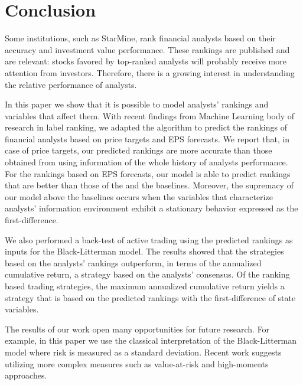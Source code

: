 \documentclass[a4paper,12pt,openright,notitlepage]{report}\usepackage[]{graphicx}\usepackage[]{color}
\begin{document}
\section{Conclusion}
\label{ch4-sec:conclusion}
Some institutions, such as StarMine, rank financial analysts based on their accuracy and investment value performance. These rankings are published and are relevant: stocks favored by top-ranked analysts will probably receive more attention from investors. Therefore, there is a growing interest in understanding the relative performance of analysts. 

In this paper we show that it is possible to model analysts' rankings and variables that affect them. With recent findings from Machine Learning body of research in label ranking, we adapted the algorithm to predict the rankings of financial analysts based on price targets and EPS forecasts. We report that, in case of price targets,  our predicted rankings are more accurate than those obtained from using information of  the whole history of analysts performance. For the rankings based on EPS forecasts, our model is able to predict rankings that are better than those of the  and the \naive{} baselines. Moreover, the supremacy of our model above the baselines occurs when  the variables that characterize analysts' information environment exhibit a stationary behavior expressed as the first-difference. 

We also performed a back-test of active trading using the predicted rankings as inputs for the Black-Litterman model. The results showed that the strategies based on the analysts' rankings outperform, in terms of the annualized cumulative return, a  strategy based on the analysts' consensus. Of the ranking based trading strategies, the maximum annualized cumulative return yields  a strategy that is based on the predicted rankings with the first-difference of state variables. 

The results of our work open many opportunities for future research. For example, in this paper we use the classical interpretation of the Black-Litterman model where risk is measured as a standard deviation. Recent work suggests utilizing more complex measures such as value-at-risk and high-moments approaches.

\end{document}
